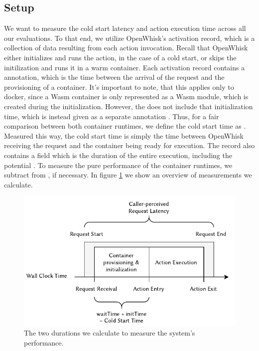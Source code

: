 
\subsection{Setup}

We want to measure the cold start latency and action execution time across all our evaluations. To that end, we utilize OpenWhisk's activation record, which is a collection of data resulting from each action invocation.  Recall that OpenWhisk either initializes and runs the action, in the case of a cold start, or skips the initilization and runs it in a warm container. Each activation record contains a  annotation, which is the time between the arrival of the request and the provisioning of a container. It's important to note, that this applies only to docker, since a Wasm container is only represented as a Wasm module, which is created during the initialization. However, the  does not include that initialization time, which is instead given as a separate annotation . Thus, for a fair comparison between both container runtimes, we define the cold start time as . Measured this way, the cold start time is simply the time between OpenWhisk receiving the request and the container being ready for execution.
The record also contains a  field which is the duration of the entire execution, including the potential . To measure the pure performance of the container runtimes, we subtract  from , if necessary. In figure \ref{fig:evaluation-time-measurement} we show an overview of measurements we calculate.

\begin{figure}
    \begin{center}
        \includegraphics{figures/EvaluationTimeMeasurement.pdf}
    \end{center}
    \caption{The two durations we calculate to measure the system's performance.}
    \label{fig:evaluation-time-measurement}
\end{figure}

